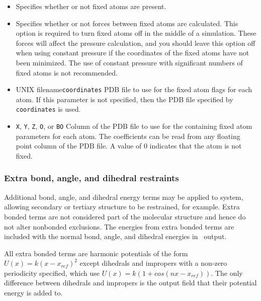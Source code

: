 \begin{itemize}

\item
{}
{Specifies whether or not fixed atoms are present.} 

\item
{}
{Specifies whether or not forces between fixed atoms are calculated.  This option is required to turn fixed atoms off in the middle of a simulation.
These forces will affect the pressure calculation, and you should leave this option off when using constant pressure if the coordinates of the fixed atoms have not been minimized.
The use of constant pressure with significant numbers of fixed atoms is not recommended.}

\item
{}
{UNIX filename}{{\tt coordinates}}
{PDB file to use for the fixed atom flags for each atom.  
If this parameter is not specified, then 
the PDB file specified by {\tt coordinates} is used.}

\item
{}
{{\tt X}, {\tt Y}, {\tt Z}, {\tt O}, or {\tt B}}{{\tt O}} 
{Column of the PDB file to use for the containing fixed atom parameters for 
each atom.  The coefficients can be read from any 
floating point column of the PDB file.  
A value of 0 indicates that the atom is not fixed.}

\end{itemize}

\subsubsection{Extra bond, angle, and dihedral restraints}

Additional bond, angle, and dihedral energy terms may be applied to system,
allowing secondary or tertiary structure to be restrained, for example.
Extra bonded terms are not considered part of the molecular structure
and hence do not alter nonbonded exclusions.
The energies from extra bonded terms are included with the normal
bond, angle, and dihedral energies in \NAMD\ output.

All extra bonded terms are harmonic potentials of the form
$U(x) = k (x-x_{ref})^2$ except dihedrals and impropers with
a non-zero periodicity specified, which use
$U(x) = k (1 + cos(n x - x_{ref}))$.
The only difference between dihedrals and
impropers is the output field that their potential energy is added to.

